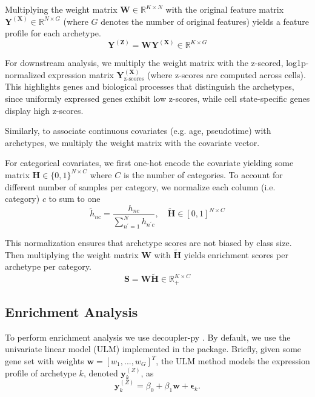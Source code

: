 \documentclass{article}
\begin{document}
Multiplying the weight matrix $\mathbf{W} \in \mathbb{R}^{K \times N}$ with the original feature matrix $\mathbf{Y}^{(\mathbf{X})} \in \mathbb{R}^{N \times G}$ (where $G$ denotes the number of original features) yields a feature profile for each archetype.
\begin{equation}
    \mathbf{Y}^{(\mathbf{Z})} = \mathbf{W} \mathbf{Y}^{(\mathbf{X})} \in \mathbb{R}^{K \times G}
\end{equation}

For downstream analysis, we multiply the weight matrix with the z-scored, log1p-normalized expression matrix $\mathbf{Y}^{(\mathbf{X})}_{\text{z-scores}}$ (where z-scores are computed across cells). This highlights genes and biological processes that distinguish the archetypes, since uniformly expressed genes exhibit low z-scores, while cell state-specific genes display high z-scores.

Similarly, to associate continuous covariates (e.g. age, pseudotime) with archetypes, we multiply the weight matrix with the covariate vector.

For categorical covariates, we first one-hot encode the covariate yielding some matrix $\mathbf{H} \in \{0, 1\}^{N \times C}$ where $C$ is the number of categories. To account for different number of samples per category, we normalize each column (i.e. category) $c$ to sum to one
\begin{equation}
    \tilde{h}_{nc} = \frac{h_{nc}}{\sum_{n^\prime=1}^N h_{n^\prime c}}, \quad \tilde{\mathbf{H}} \in [0, 1]^{N \times C}
\end{equation}

This normalization ensures that archetype scores are not biased by class size. Then multiplying the weight matrix $\mathbf{W}$ with $\tilde{\mathbf{H}}$ yields enrichment scores per archetype per category.
\begin{equation}
    \mathbf{S} = \mathbf{W} \tilde{\mathbf{H}} \in \mathbb{R}_+^{K \times C}
\end{equation}

\subsection{Enrichment Analysis}

To perform enrichment analysis we use decoupler-py \autocite{badiaDecoupler2022}. By default, we use the univariate linear model (ULM) implemented in the package. Briefly, given some gene set with weights $\mathbf{w} = \left[w_1, ..., w_G\right]^T$, the ULM method models the expression profile of archetype $k$, denoted $\mathbf{y}^{(Z)}_{k}$, as
\begin{equation}
    \mathbf{y}^{(Z)}_{k} = \beta_0 + \beta_1 \mathbf{w} + \mathbf{\epsilon}_{k}.
\end{equation}
\end{document}
